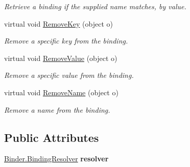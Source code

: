\begin{DoxyCompactItemize}
\begin{DoxyCompactList}\small\item\em Retrieve a binding if the supplied name matches, by value. \end{DoxyCompactList}\item 
\hypertarget{classstrange_1_1framework_1_1impl_1_1_binding_aea72624611f06e26d5f0e29470ccfb76}{virtual void \hyperlink{classstrange_1_1framework_1_1impl_1_1_binding_aea72624611f06e26d5f0e29470ccfb76}{Remove\-Key} (object o)}\label{classstrange_1_1framework_1_1impl_1_1_binding_aea72624611f06e26d5f0e29470ccfb76}

\begin{DoxyCompactList}\small\item\em Remove a specific key from the binding. \end{DoxyCompactList}\item 
\hypertarget{classstrange_1_1framework_1_1impl_1_1_binding_a278e130e4402e099201c308da15871f4}{virtual void \hyperlink{classstrange_1_1framework_1_1impl_1_1_binding_a278e130e4402e099201c308da15871f4}{Remove\-Value} (object o)}\label{classstrange_1_1framework_1_1impl_1_1_binding_a278e130e4402e099201c308da15871f4}

\begin{DoxyCompactList}\small\item\em Remove a specific value from the binding. \end{DoxyCompactList}\item 
\hypertarget{classstrange_1_1framework_1_1impl_1_1_binding_a5c8d21d0817375050735c39727126cf7}{virtual void \hyperlink{classstrange_1_1framework_1_1impl_1_1_binding_a5c8d21d0817375050735c39727126cf7}{Remove\-Name} (object o)}\label{classstrange_1_1framework_1_1impl_1_1_binding_a5c8d21d0817375050735c39727126cf7}

\begin{DoxyCompactList}\small\item\em Remove a name from the binding. \end{DoxyCompactList}\end{DoxyCompactItemize}
\subsection*{Public Attributes}
\begin{DoxyCompactItemize}
\item 
\hypertarget{classstrange_1_1framework_1_1impl_1_1_binding_a3143beff45f6b1b1b1933b5839702b6e}{\hyperlink{classstrange_1_1framework_1_1impl_1_1_binder_aa4e977fc31063ca4d0b029b1abe39dad}{Binder.\-Binding\-Resolver} {\bfseries resolver}}\label{classstrange_1_1framework_1_1impl_1_1_binding_a3143beff45f6b1b1b1933b5839702b6e}

\end{DoxyCompactItemize}
